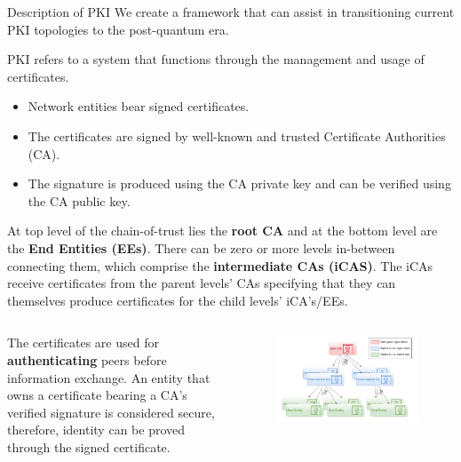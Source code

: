 \documentclass[10pt]{beamer}
\begin{document}
\begin{frame}[allowframebreaks]{Description of PKI}
\vfill
\textcolor{blue!30!red!90}{We create a framework that can assist in transitioning current PKI topologies to the post-quantum era.}
\medskip
\begin{tcolorbox}[
	colframe = blue!30,
	colback  = blue!8
	]%
	PKI refers to a system that functions through the management and usage of certificates.
	\begin{itemize}
		\item Network entities bear signed certificates.
		\item The certificates are signed by well-known and trusted Certificate Authorities (CA).
		\item The signature is produced using the CA private key and can be verified using the CA public key.
	\end{itemize}
\end{tcolorbox}
\vfill

\break 

At top level of the chain-of-trust lies the \textbf{root CA} and at the bottom level are the \textbf{End Entities (EEs)}. There can be zero or more levels in-between connecting them, which comprise the \textbf{intermediate CAs (iCAS)}. The iCAs receive certificates from the parent levels' CAs specifying that they can themselves produce certificates for the child levels' iCA's/EEs.

\medskip

\begin{columns}[T]	
	\medskip
	
	The certificates are used for \textbf{authenticating} peers before information exchange. An entity that owns a certificate bearing a CA's verified signature is considered secure, therefore, identity can be proved through the signed certificate.
	
	\begin{figure}
		\begin{center}
		\includegraphics[width=\textwidth]{images/PKI.drawio.pdf}
		\end{center}
	\end{figure}
	\smallskip
\end{columns}
\end{frame}
\end{document}
